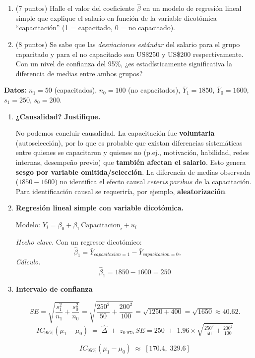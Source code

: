 \documentclass[10pt,a4paper]{article}
\begin{document}
\begin{enumerate}
\begin{enumerate}
    \item  (7 puntos) Halle el valor del coeficiente $\hat{\beta}$ en un modelo de regresión lineal simple que explique el salario en función de la variable dicotómica ``capacitación'' (1 = capacitado, 0 = no capacitado).
    \item  (8 puntos) Se sabe que las \textit{desviaciones estándar} del salario para el grupo capacitado y para el no capacitado  son  US\$250  y  US\$200 respectivamente. Con un nivel de confianza del 95\%, ¿es estadísticamente significativa la diferencia de medias entre ambos grupos?
\end{enumerate}


{\color{blue} 
\textbf{Datos:} $n_1=50$ (capacitados), $n_0=100$ (no capacitados), $\bar{Y}_1=1850$, $\bar{Y}_0=1600$, $s_1=250$, $s_0=200$.

\begin{enumerate}
\item \textbf{¿Causalidad? Justifique.}

No podemos concluir causalidad. La capacitación fue \textbf{voluntaria} (autoselección), por lo que es probable que existan diferencias sistemáticas entre quienes se capacitaron y quienes no (p.ej., motivación, habilidad, redes internas, desempeño previo) que \textbf{también afectan el salario}. Esto genera \textbf{sesgo por variable omitida/selección}. La diferencia de medias observada ($1850-1600$) no identifica el efecto causal $ceteris\ paribus$ de la capacitación. Para identificación causal se requeriría, por ejemplo, \textbf{aleatorización}.


\item \textbf{Regresión lineal simple con variable dicotómica.}

Modelo: $Y_i=\beta_0+\beta_1\,\text{Capacitacion}_i+u_i$

\textit{Hecho clave.} Con un regresor dicotómico:
\[
\hat{\beta}_1=\bar{Y}_{capacitacion=1}-\bar{Y}_{capacitacion=0},\qquad 
\]
\textit{Cálculo.}
\[
\hat{\beta}_1=1850-1600=250
\]


\item\textbf{Intervalo de confianza}


\[
SE=\sqrt{\frac{s_1^2}{n_1}+\frac{s_0^2}{n_0}}=\sqrt{\frac{250^2}{50}+\frac{200^2}{100}}
=\sqrt{1250+400}=\sqrt{1650}\approx 40.62.
\]
\[
IC_{95\%}(\mu_1 - \mu_0) \;=\;
\hat{\Delta} \; \pm \; z_{0.975}\, SE
= 250 \; \pm \; 1.96 \times \sqrt{\tfrac{250^2}{50} + \tfrac{200^2}{100}}
\]

\[
IC_{95\%}(\mu_1 - \mu_0) \;\approx\; [170.4,\; 329.6]
\]



\end{enumerate}}
\end{enumerate}
\end{document}
